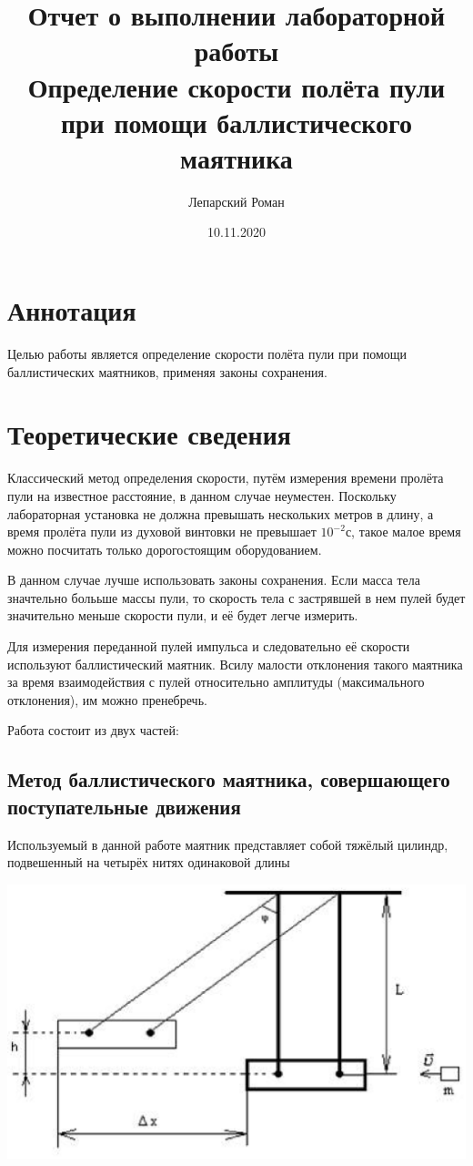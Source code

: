 \documentclass[a4paper, 12pt]{article}
\title{Отчет о выполнении лабораторной работы \\ Определение скорости полёта пули при помощи баллистического маятника}
\author{Лепарский Роман}
\date{10.11.2020}
\begin{document}
	\maketitle

	\newpage
	
	\section{Аннотация}

		Целью работы является определение скорости полёта пули при помощи баллистических маятников, применяя законы сохранения.

	\section{Теоретические сведения}

		Классический метод определения скорости, путём измерения времени пролёта пули на известное расстояние, в данном случае неуместен.
		Поскольку лабораторная установка не должна превышать нескольких метров в длину, а время пролёта пули из духовой винтовки не 
		превышает $10^{-2}$с, такое малое время можно посчитать только дорогостоящим оборудованием.

		В данном случае лучше использовать законы сохранения. Если масса тела значтельно болььше массы пули, то скорость тела с застрявшей в нем пулей будет значительно меньше скорости пули, и её будет легче измерить.

		Для измерения переданной пулей импульса и следовательно её скорости используют баллистический маятник. 
		Всилу малости отклонения такого маятника за время взаимодействия с пулей относительно амплитуды (максимального отклонения), им можно пренебречь.

		Работа состоит из двух частей:

		\subsection{Метод баллистического маятника, совершающего поступательные движения}
		
			Используемый в данной работе маятник представляет собой тяжёлый цилиндр, подвешенный на четырёх нитях одинаковой длины

			\begin{center}
			\includegraphics[scale = 0.5]{pendulum.eps}
			\end{center}
\end{document}

